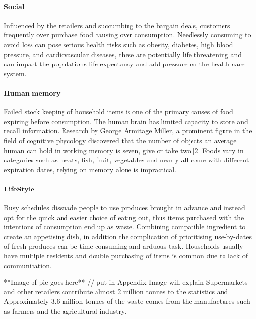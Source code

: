 \documentclass[a4paper, 11pt]{article}
\begin{document}
\paragraph{Social} Influenced by the retailers and succumbing to the bargain deals, customers frequently over purchase food causing over consumption. Needlessly consuming to avoid loss can pose serious health risks such as obesity, diabetes, high blood pressure, and cardiovascular diseases, these are potentially life threatening and can impact the populations life expectancy and add pressure on the health care system. 

\paragraph{Human memory} Failed stock keeping of household items is one of the primary causes of food expiring before consumption. The human brain has limited capacity to store and recall information. Research by George Armitage Miller, a prominent figure in the field of cognitive phycology discovered that the number of objects an average human can hold in working memory is seven, give or take two.[2] Foods vary in categories such as meats, fish, fruit, vegetables and nearly all come with different expiration dates, relying on memory alone is impractical. 

\paragraph{LifeStyle} Busy schedules dissuade people to use produces brought in advance and instead opt for the quick and easier choice of eating out, thus items purchased with the intentions of consumption end up as waste. Combining compatible ingredient to create an appetising dish, in addition the complication of prioritising use-by-dates of fresh produces can be time-consuming and arduous task. Households usually have multiple residents and double purchasing of items is common due to lack of communication. 

\vspace{\baselineskip}

**Image of pie goes here** // put in Appendix
Image will explain-Supermarkets and other retailers contribute almost 2 million tonnes to the statistics and Approximately 3.6 million tonnes of the waste comes from the manufactures such as farmers and the agricultural industry. 

\vspace{\baselineskip}
\vspace{\baselineskip}
\vspace{\baselineskip}
\end{document}
